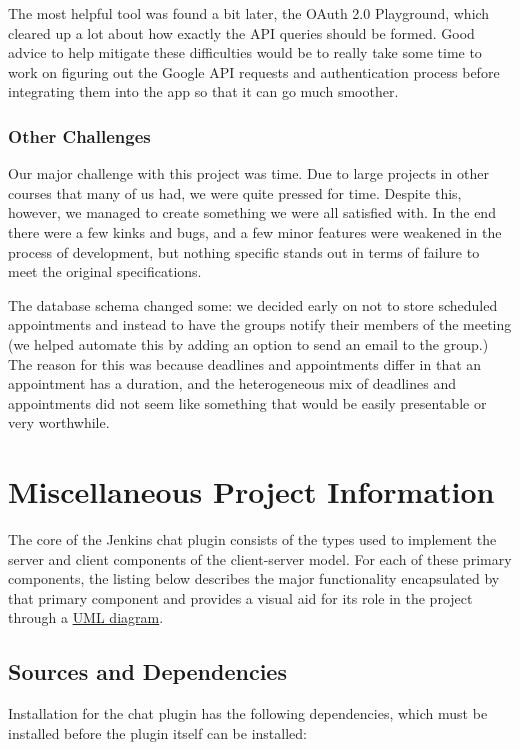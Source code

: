\documentclass{article}
\begin{document}
			The most helpful tool
			was found a bit later, the OAuth 2.0 Playground, which cleared up a lot about
			how exactly the API queries should be formed. Good advice to help mitigate
			these difficulties would be to really take some time to work on figuring
			out the Google API requests and authentication process before integrating
			them into the app so that it can go much smoother.

			\subsubsection[Other Challenges]{Other Challenges}
			Our major challenge with this project was time. Due to large projects in
			other courses that many of us had, we were quite pressed for time. Despite
			this, however, we managed to create something we were all satisfied with.
			In the end there were a few kinks and bugs, and a few minor features were
			weakened in the process of development, but nothing specific stands out
			in terms of failure to meet the original specifications.

			The database
			schema changed some: we decided early on not to store scheduled appointments
			and instead to have the groups notify their members of the meeting (we helped
			automate this by adding an option to send an email to the group.) The reason
			for this was because deadlines and appointments differ in that an appointment
			has a duration, and the heterogeneous mix of deadlines and appointments
			did not seem like something that would be easily presentable or very worthwhile.


	\section[Appendix]{Miscellaneous Project Information}
	The core of the Jenkins chat plugin consists of the types used to
	implement the server and client components of the client-server model.
	For each of these primary components, the listing below describes the
	major functionality encapsulated by that primary component and provides
	a visual aid for its role in the project through a 
	\href{http://www.csci.csusb.edu/dick/samples/uml0.html}{UML diagram}.

		\subsection[Dependencies]{Sources and Dependencies}
		Installation for the chat plugin has the following dependencies, which
		must be installed before the plugin itself can be installed:
\end{document}
